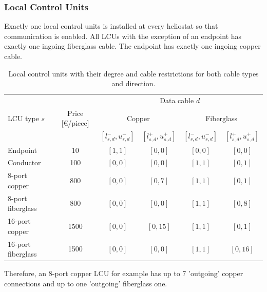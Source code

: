 \subsubsection{Local Control Units}
  Exactly one local control units is installed at every heliostat so that communication is enabled. All LCUs with the exception of an endpoint has exactly one ingoing fiberglass cable. The endpoint has exactly one ingoing copper cable.
  \begin{table}[H]
  \caption{Local control units with their degree and cable restrictions for both cable types and direction.}
  \label{tab:data:lcu}
  \begin{center}
    \begin{tabular}{lc|cc|cc}
      & & \multicolumn{4}{c}{Data cable $d$} \\
      LCU type $s$ & Price [\euro/piece] & \multicolumn{2}{c|}{Copper} & \multicolumn{2}{c}{Fiberglass} \\
      && $[l^-_{s,d},u^-_{s,d}]$ & $[l^+_{s,d},u^+_{s,d}]$ & $[l^-_{s,d},u^-_{s,d}]$ & $[l^+_{s,d},u^+_{s,d}]$\\
      \midrule
      Endpoint & 10 & $[1,1]$ & $[0,0]$ & $[0,0]$ & $[0,0]$ \\
      Conductor & 100 & $[0,0]$ & $[0,0]$ & $[1,1]$ & $[0,1]$ \\
      8-port copper & 800 & $[0,0]$ & $[0,7]$ & $[1,1]$ & $[0,1]$ \\
      8-port fiberglass & 800 & $[0,0]$ & $[0,0]$ & $[1,1]$ & $[0,8]$ \\
      16-port copper & 1500 & $[0,0]$ & $[0,15]$ & $[1,1]$ & $[0,1]$ \\
      16-port fiberglass & 1500 & $[0,0]$ & $[0,0]$ & $[1,1]$ & $[0,16]$ \\
    \end{tabular}
  \end{center}
  \end{table}
  Therefore, an 8-port copper LCU for example has up to 7 'outgoing' copper connections and up to one 'outgoing' fiberglass one.

